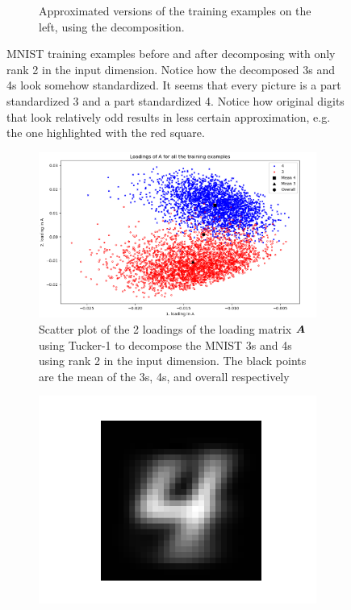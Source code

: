 \begin{figure}
\begin{subfigure}{0.45\linewidth}
        \captionsetup{width=.9\linewidth}
        \caption{Approximated versions of the training examples on the left, using the decomposition.}
    \end{subfigure}
    \captionsetup{width=.95\linewidth}
    \caption{MNIST training examples before and after decomposing with only rank 2 in the input dimension. Notice how the decomposed 3s and 4s look somehow standardized. It seems that every picture is a part standardized 3 and a part standardized 4. Notice how original digits that look relatively odd results in less certain approximation, e.g. the one highlighted with the red square.}
    \label{fig:decompExample3_4}
\end{figure}
\begin{figure}
    \centering
    \begin{subfigure}{0.99\linewidth}
        \includegraphics[width=\linewidth]{Pics/06_results/LoadingsOfAScatterMNIST.png}
        \caption{Scatter plot of the 2 loadings of the loading matrix $\boldsymbol{A}$ using Tucker-1 to decompose the MNIST 3s and 4s using rank 2 in the input dimension. The black points are the mean of the 3s, 4s, and overall respectively}
        \label{fig:loadingAMatrix}
    \end{subfigure}
    \begin{subfigure}{0.3\linewidth}
    \centering
        \includegraphics[width=.5\linewidth]{Pics/06_results/general4.png}

\end{subfigure}
\end{figure}
